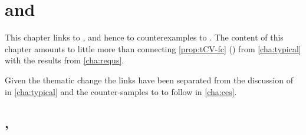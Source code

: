 \chapter{ and }
\label{sec:typicalRequs}


\begin{note}
  This chapter links \tC{} to , and hence \tC{} to counterexamples to \issueConstraint{}.
  The content of this chapter amounts to little more than connecting \autoref{prop:tCV-fc} () from \autoref{cha:typical} with the results from \autoref{cha:requs}.

  Given the thematic change the links have been separated from the discussion of \tCV{} in \autoref{cha:typical} and the counter-samples to \issueConstraint{} to follow in \autoref{cha:ces}.
\end{note}



\section{, }
\label{sec:tc2-requ1}


